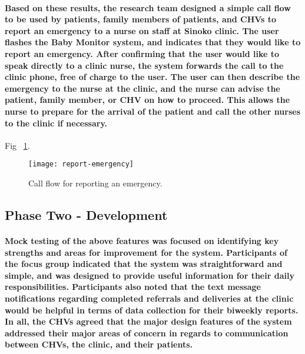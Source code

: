 \paragraph{Based on these results, the research team designed a simple call flow to be used by patients, family members of patients, and CHVs to report an emergency to a nurse on staff at Sinoko clinic. The user flashes the Baby Monitor system, and indicates that they would like to report an emergency. After confirming that the user would like to speak directly to a clinic nurse, the system forwards the call to the clinic phone, free of charge to the user. The user can then describe the emergency to the nurse at the clinic, and the nurse can advise the patient, family member, or CHV on how to proceed. This allows the nurse to prepare for the arrival of the patient and call the other nurses to the clinic if necessary.}

Fig ~\ref{fig:emergency}.
\begin{figure}[tbp]
	\begin{center}
	\texttt{[image: report-emergency]}
	\end{center}
	\caption{Call flow for reporting an emergency.}
	\label{fig:emergency}
\end{figure}

\subsection{Phase Two - Development}
\paragraph{Mock testing of the above features was focused on identifying key strengths and areas for improvement for the system. Participants of the focus group indicated that the system was straightforward and simple, and was designed to provide useful information for their daily responsibilities. Participants also noted that the text message notifications regarding completed referrals and deliveries at the clinic would be helpful in terms of data collection for their biweekly reports. In all, the CHVs agreed that the major design features of the system addressed their major areas of concern in regards to communication between CHVs, the clinic, and their patients.}


